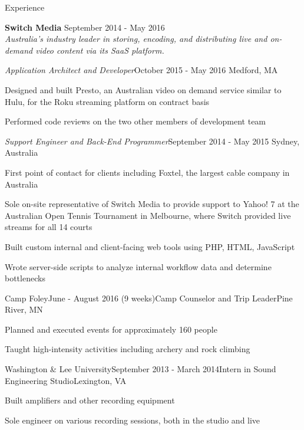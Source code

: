 \documentclass{resume}
\begin{document}
  \begin{rSection}{Experience}
    
    {\bf Switch Media} \hfill { September 2014 - May 2016}\\ 
    {\em Australia's industry leader in storing, encoding, and distributing live and on-demand video content via its SaaS platform.} 
    
 \begin{addmargin}[2em]{0em}   
 
   \begin{rSubsection}{\em Application Architect and Developer}{October 2015 - May 2016}{ }{\hfill Medford, MA}
    \item Designed and built Presto, an Australian video on demand service similar to Hulu, for the Roku streaming platform on contract basis
    \item Performed code reviews on the two other members of development team
    \end{rSubsection}
    
   \begin{rSubsection}{\em Support Engineer and Back-End Programmer}{September 2014 - May 2015}{ }{Sydney, Australia}
    \item First point of contact for clients including Foxtel, the largest cable company in Australia
    \item Sole on-site representative of Switch Media to provide support to Yahoo! 7 at the Australian Open Tennis Tournament in Melbourne, where Switch provided live streams for all 14 courts
    \item Built custom internal and client-facing web tools using PHP, HTML, JavaScript
    \item Wrote server-side scripts to analyze internal workflow data and determine bottlenecks
    \end{rSubsection}
\end{addmargin}  
  
    \begin{rSubsection}{Camp Foley}{June - August 2016 (9 weeks)}{Camp Counselor and Trip Leader}{Pine River, MN}
    \item Planned and executed events for approximately 160 people
    \item Taught high-intensity activities including archery and rock climbing
    \end{rSubsection}

    \begin{rSubsection}{Washington \& Lee University}{September 2013 - March 2014}{Intern in Sound Engineering Studio}{Lexington, VA}
    \item Built amplifiers and other recording equipment
    \item Sole engineer on various recording sessions, both in the studio and live
    \end{rSubsection}
  
  \end{rSection}
  
\end{document}
